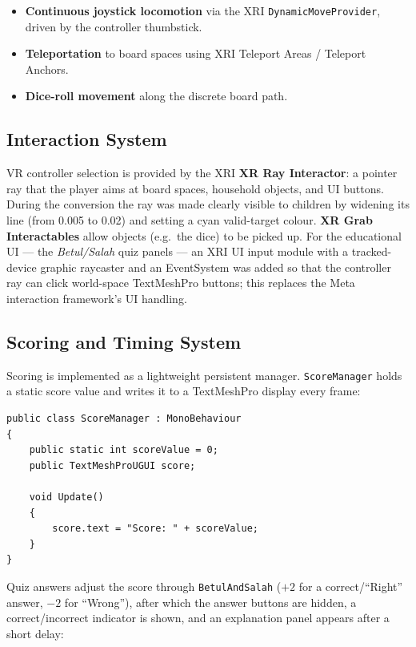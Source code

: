 \documentclass[a4paper,12pt]{article}
\begin{document}
\begin{itemize}
  \item \textbf{Continuous joystick locomotion} via the XRI \texttt{DynamicMoveProvider}, driven by the controller thumbstick.
  \item \textbf{Teleportation} to board spaces using XRI Teleport Areas / Teleport Anchors.
  \item \textbf{Dice-roll movement} along the discrete board path.
\end{itemize}

\subsection{Interaction System}
\label{sec:interaction}

VR controller selection is provided by the XRI \textbf{XR Ray Interactor}: a pointer ray that the player aims at board spaces, household objects, and UI buttons. During the conversion the ray was made clearly visible to children by widening its line (from 0.005 to 0.02) and setting a cyan valid-target colour. \textbf{XR Grab Interactables} allow objects (e.g.\ the dice) to be picked up. For the educational UI --- the \emph{Betul/Salah} quiz panels --- an XRI UI input module with a tracked-device graphic raycaster and an EventSystem was added so that the controller ray can click world-space TextMeshPro buttons; this replaces the Meta interaction framework's UI handling.

\subsection{Scoring and Timing System}

Scoring is implemented as a lightweight persistent manager. \texttt{ScoreManager} holds a static score value and writes it to a TextMeshPro display every frame:

\begin{lstlisting}[language={[Sharp]C}]
public class ScoreManager : MonoBehaviour
{
    public static int scoreValue = 0;
    public TextMeshProUGUI score;

    void Update()
    {
        score.text = "Score: " + scoreValue;
    }
}
\end{lstlisting}

Quiz answers adjust the score through \texttt{BetulAndSalah} ($+2$ for a correct/``Right'' answer, $-2$ for ``Wrong''), after which the answer buttons are hidden, a correct/incorrect indicator is shown, and an explanation panel appears after a short delay:
\end{document}
